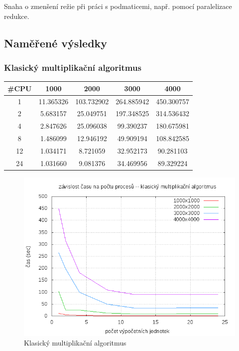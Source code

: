 \documentclass[12pt,a4paper]{article}
\begin{document}
Snaha o zmenšení režie při práci s podmaticemi, např. pomocí paralelizace redukce.




\pagebreak
\subsection{Naměřené výsledky}


\subsubsection{Klasický multiplikační algoritmus}


\begin{center}
\begin{tabular}{ | c || c | c | c | c | }
\hline
\#CPU    &   1000		&	2000	&	3000	&	4000	\\
\hline
\hline
1    &   11.365326		&	103.732902	&	264.885942 	& 450.300757 	\\ \hline
2    &   5.683157		&	25.049751	&	197.348525 	& 314.536432 	\\ \hline
4    &   2.847626		&	25.096038	&	99.390237 	& 180.675981 	 \\	 \hline
8    &   1.486099		&	12.946192	&	49.909194 	& 108.842585	\\	 \hline
12   &   1.034171		&	8.721059 	&	32.952173	& 90.281103 	\\	 \hline
24   &   1.031660		&	9.081376	&	34.469956	& 89.329224  	\\ \hline
\end{tabular}
\end{center}

\pagebreak
\begin{figure}[h]
\includegraphics[width=\textwidth]{graph/classic.png}
\caption{Klasický multiplikační algoritmus}
\label{data4}
\end{figure}
\end{document}
